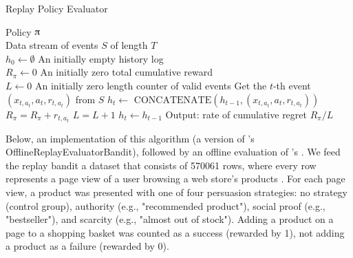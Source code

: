 \documentclass{jss}
\begin{document}
\begin{algorithm}[H]
\caption{Replay Policy Evaluator}
\label{Alg:LiBandit}
\begin{algorithmic}
\REQUIRE  Policy $\piup$ \\
                 Data stream of events $S$ of length $T$  \\
                 $h_0 \leftarrow \emptyset$ {An initially empty history log}\\
                 $R_\pi \leftarrow 0$ {An initially zero total cumulative reward}\\
                 $L \leftarrow 0$ {An initially zero length counter of valid events}
	\STATE Get the $t$-th event \( (x_{t,a_t},a_{t},r_{t,a_t}) \) from  $S$
	       \STATE $h_{t} \leftarrow $  \(\textrm{CONCATENATE}\left( h_{t-1},(x_{t,a_t},a_{t},r_{t,a_t})  \right)\)
	       \STATE $R_\pi = R_\pi + r_{t,a_t}$
	       \STATE $L = L + 1$
	\ELSE
	        \STATE $h_{t} \leftarrow  h_{t-1} $
	\ENDIF
\ENDFOR
\STATE Output: rate of cumulative regret $R_\pi / L $
\end{algorithmic}
\end{algorithm}

Below, an implementation of this algorithm (a version of 's  OfflineReplayEvaluatorBandit), followed by an offline evaluation of 's . We feed the replay bandit a dataset that consists of 570061 rows, where every row represents a page view of a user browsing a web store's products \citep{Kaptein2018}. For each page view, a product was presented with one of four persuasion strategies: no strategy (control group), authority (e.g., "recommended product"), social proof (e.g., "bestseller"), and scarcity (e.g., "almost out of stock"). Adding a product on a page to a shopping basket was counted as a success (rewarded by 1), not adding a product as a failure (rewarded by 0).
\end{document}
